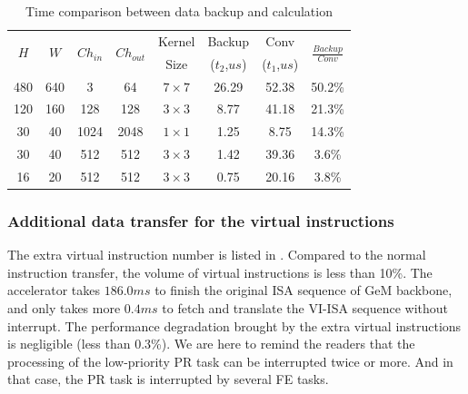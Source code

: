 \begin{table}[t]
 \centering
 \caption{Time comparison between data backup and calculation}
 \begin{tabular}{|c|c|c|c|c|c|c|c|}
 \hline
 \multirow{2}[2]{*}{$H$} & \multirow{2}[2]{*}{$W$} & \multirow{2}[2]{*}{$Ch_{in}$} & \multirow{2}[2]{*}{$Ch_{out}$} & Kernel & Backup & Conv & \multirow{2}[2]{*}{$\frac{Backup}{Conv}$} \bigstrut[t]\\
  & & & & Size & ($t_2$,$us$) & ($t_1$,$us$) & \\
 \hline
 480 & 640 & 3 & 64 & $7 \times 7$ & 26.29 & 52.38 & 50.2\% \\
 \hline
 120 & 160 & 128 & 128 & $3 \times 3$ & 8.77 & 41.18 & 21.3\% \\
 \hline
 30 & 40 & 1024 & 2048 & $1 \times 1$ & 1.25 & 8.75 & 14.3\% \\
 \hline
 30 & 40 & 512 & 512 & $3 \times 3$ & 1.42 & 39.36 & 3.6\% \\
 \hline
 16 & 20 & 512 & 512 & $3 \times 3$ & 0.75 & 20.16 & 3.8\% \\
 \hline
 \end{tabular}%
 \label{tab:timecompare}%
\end{table}%




\subsubsection{ Additional data transfer for the virtual instructions }

The extra virtual instruction number is listed in . Compared to the normal instruction transfer, the volume of virtual instructions is less than 10\%. The accelerator takes $186.0ms$ to finish the original ISA sequence of GeM backbone, and only takes more $0.4ms$ to fetch and translate the VI-ISA sequence without interrupt. The performance degradation brought by the extra virtual instructions is negligible (less than 0.3\%). 
We are here to remind the readers that the processing of the low-priority PR task can be interrupted twice or more. And in that case, the PR task is interrupted by several FE tasks.




